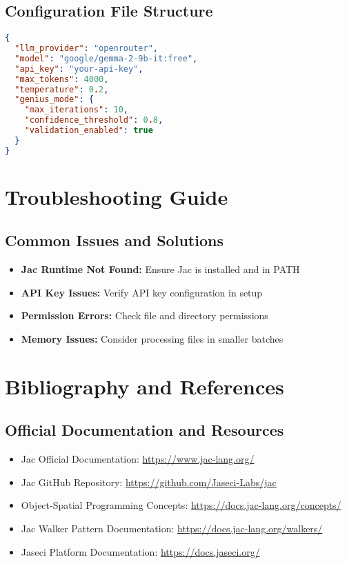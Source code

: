 \documentclass[12pt,a4paper]{article}
\begin{document}
\subsection{Configuration File Structure}
\begin{lstlisting}[language=json]
{
  "llm_provider": "openrouter",
  "model": "google/gemma-2-9b-it:free",
  "api_key": "your-api-key",
  "max_tokens": 4000,
  "temperature": 0.2,
  "genius_mode": {
    "max_iterations": 10,
    "confidence_threshold": 0.8,
    "validation_enabled": true
  }
}
\end{lstlisting}

\section{Troubleshooting Guide}

\subsection{Common Issues and Solutions}
\begin{itemize}
    \item \textbf{Jac Runtime Not Found:} Ensure Jac is installed and in PATH
    \item \textbf{API Key Issues:} Verify API key configuration in setup
    \item \textbf{Permission Errors:} Check file and directory permissions
    \item \textbf{Memory Issues:} Consider processing files in smaller batches
\end{itemize}

\section{Bibliography and References}

\subsection{Official Documentation and Resources}
\begin{itemize}
    \item Jac Official Documentation: \url{https://www.jac-lang.org/}
    \item Jac GitHub Repository: \url{https://github.com/Jaseci-Labs/jac}
    \item Object-Spatial Programming Concepts: \url{https://docs.jac-lang.org/concepts/}
    \item Jac Walker Pattern Documentation: \url{https://docs.jac-lang.org/walkers/}
    \item Jaseci Platform Documentation: \url{https://docs.jaseci.org/}
\end{itemize}
\end{document}
